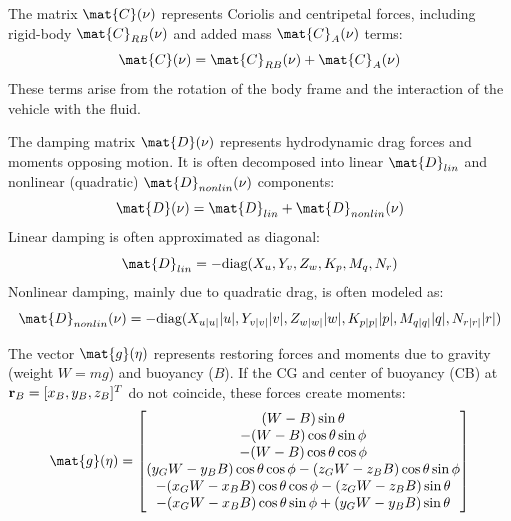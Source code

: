 The matrix $\mat{C}(\vect{\nu})$ represents Coriolis and centripetal forces, including rigid-body $\mat{C}_{RB}(\vect{\nu})$ and added mass $\mat{C}_A(\vect{\nu})$ terms:
\begin{equation}
    \mat{C}(\vect{\nu}) = \mat{C}_{RB}(\vect{\nu}) + \mat{C}_A(\vect{\nu})
\end{equation}
These terms arise from the rotation of the body frame and the interaction of the vehicle with the fluid.

The damping matrix $\mat{D}(\vect{\nu})$ represents hydrodynamic drag forces and moments opposing motion. It is often decomposed into linear $\mat{D}_{lin}$ and nonlinear (quadratic) $\mat{D}_{nonlin}(\vect{\nu})$ components:
\begin{equation}
    \mat{D}(\vect{\nu}) = \mat{D}_{lin} + \mat{D}_{nonlin}(\vect{\nu})
\end{equation}
Linear damping is often approximated as diagonal:
\begin{equation}
    \mat{D}_{lin} = -\text{diag}(X_u, Y_v, Z_w, K_p, M_q, N_r)
\end{equation}
Nonlinear damping, mainly due to quadratic drag, is often modeled as:
\begin{equation}
    \mat{D}_{nonlin}(\vect{\nu}) = -\text{diag}(X_{u|u|}|u|, Y_{v|v|}|v|, Z_{w|w|}|w|, K_{p|p|}|p|, M_{q|q|}|q|, N_{r|r|}|r|)
\end{equation}

The vector $\mat{g}(\vect{\eta})$ represents restoring forces and moments due to gravity (weight $W=mg$) and buoyancy ($B$). If the CG and center of buoyancy (CB) at $\mathbf{r}_B = [x_B, y_B, z_B]^T$ do not coincide, these forces create moments:
\begin{equation}
    \mat{g}(\vect{\eta}) =
    \begin{bmatrix}
        (W-B)\sin\theta \\
        -(W-B)\cos\theta\sin\phi \\
        -(W-B)\cos\theta\cos\phi \\
        (y_G W - y_B B)\cos\theta\cos\phi - (z_G W - z_B B)\cos\theta\sin\phi \\
        -(x_G W - x_B B)\cos\theta\cos\phi - (z_G W - z_B B)\sin\theta \\ %
        -(x_G W - x_B B)\cos\theta\sin\phi + (y_G W - y_B B)\sin\theta %
    \end{bmatrix}
\end{equation}

